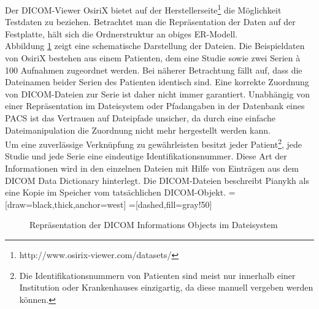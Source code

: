 Der DICOM-Viewer OsiriX bietet auf der Herstellerseite\footnote{http://www.osirix-viewer.com/datasets/} die Möglichkeit Testdaten zu beziehen. Betrachtet man die Repräsentation der Daten auf der Festplatte, hält sich die Ordnerstruktur an obiges ER-Modell.\\

\pagebreak
Abbildung \ref{filesystemrep} zeigt eine schematische Darstellung der Dateien. Die Beispieldaten von OsiriX bestehen aus einem Patienten, dem eine Studie sowie zwei Serien à 100 Aufnahmen zugeordnet werden.
Bei näherer Betrachtung fällt auf, dass die Dateinamen beider Serien des Patienten identisch sind. Eine korrekte Zuordnung von DICOM-Dateien zur Serie ist daher nicht immer garantiert. Unabhängig von einer Repräsentation im Dateisystem oder Pfadangaben in der Datenbank eines PACS ist das Vertrauen auf Dateipfade unsicher, da durch eine einfache Dateimanipulation die Zuordnung nicht mehr hergestellt werden kann.\\
Um eine zuverlässige Verknüpfung zu gewährleisten besitzt jeder Patient\footnote{Die Identifikationsnummern von Patienten sind meist nur innerhalb einer Institution oder Krankenhauses einzigartig, da diese manuell vergeben werden können\cite[5.6.2]{pianykh:dicom}.}, jede Studie und jede Serie eine eindeutige Identifikationsnummer. Diese Art der Informationen wird in den einzelnen Dateien mit Hilfe von Einträgen aus dem DICOM Data Dictionary\cite{dicom:dd} hinterlegt. Die DICOM-Dateien beschreibt Pianykh \cite[S. 47]{pianykh:dicom}
als eine Kopie im Speicher vom tatsächlichen DICOM-Objekt.
=[draw=black,thick,anchor=west]
=[dashed,fill=gray!50]
\begin{figure}[htbp]
\centering
\caption{Repräsentation der DICOM Informations Objects im Dateisystem}
\label{filesystemrep}
\end{figure}


